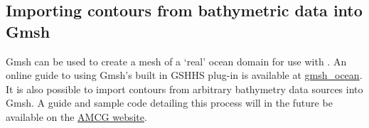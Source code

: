 \subsection{Importing contours from bathymetric data into Gmsh}

Gmsh can be used to create a mesh of a `real' ocean domain for use with \fluidity. An online guide to using Gmsh's built in
GSHHS plug-in is available at \href{http://perso.uclouvain.be/jonathan.lambrechts/gmsh_ocean/}{gmsh\_ocean}.
It is also possible to import contours from arbitrary bathymetry data sources into Gmsh. A guide and sample code detailing this process will
in the future be available on the \href{http://amcg.ese.ic.ac.uk}{AMCG website}.
